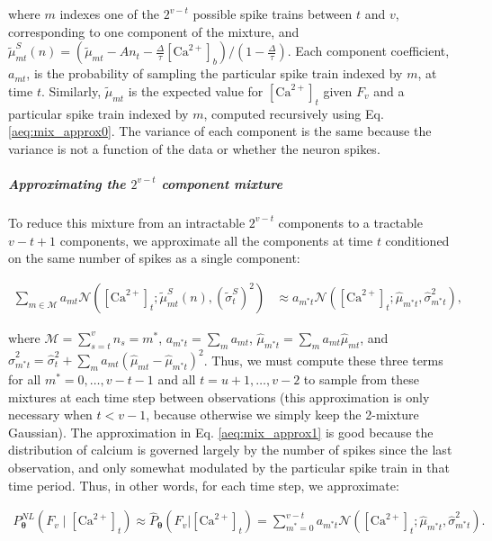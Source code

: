 \documentclass[10pt]{article}
\providecommand{\ve}[1]{\boldsymbol{#1}}
\providecommand{\ve}[1]{\boldsymbol{#1}}
\newcommand{\thetn}{\ve{\theta}}
\newcommand{\p}{P_{\thetn}}
\newcommand{\phat}{\widehat{P}_{\thetn}(F_v | \Ca_t)}
\newcommand{\m}{m^{\ast}}
\newcommand{\Ca}{[\text{Ca}^{2+}]}
\begin{document}
\noindent  where $m$ indexes one of the $2^{v-t}$ possible spike trains between $t$ and $v$, corresponding to one component of the mixture, and $\widetilde{\mu}^{S}_{mt}(n)=(\widetilde{\mu}_{mt} - A n_t - \frac{\Delta}{\tau} \Ca_b)/(1-\frac{\Delta}{\tau})$.  Each component coefficient, $a_{mt}$, is the probability of sampling the particular spike train indexed by $m$, at time $t$.  Similarly, $\widetilde{\mu}_{mt}$ is the expected value for $\Ca_t$ given $F_v$ and a particular spike train indexed by $m$, computed recursively using Eq. \ref{aeq:mix_approx0}.  The variance of each component is the same because the variance is not a function of the data or whether the neuron spikes.

\subparagraph{Approximating the $2^{v-t}$ component mixture}

To reduce this mixture from an intractable $2^{v-t}$ components to a tractable $v-t+1$ components, we approximate all the components at time $t$ conditioned on the same number of spikes as a single component: %

\begin{align} \label{aeq:mix_approx1}
\sum_{m \in \mathcal{M}} a_{mt} \mathcal{N}(\Ca_t; \widetilde{\mu}^S_{mt}(n), (\widetilde{\sigma}^S_t)^2) &\approx a_{\m t} \mathcal{N}(\Ca_t; \widehat{\mu}_{\m t}, \widehat{\sigma}_{\m t}^2),
\end{align}

\noindent where $\mathcal{M}=\sum_{s=t}^v n_s=m^\ast$, $a_{\m t}=\sum_m a_{mt}$, $\widehat{\mu}_{\m t}=\sum_m a_{mt} \widehat{\mu}_{mt}$, and $\widehat{\sigma}_{\m t}^2 = \widehat{\sigma}_t^2 + \sum_m a_{mt} (\widehat{\mu}_{mt}-\widehat{\mu}_{\m t})^2$.  Thus, we must compute these three terms for all $\m=0,\ldots,v-t-1$ and all $t=u+1,\ldots, v-2$ to sample from these mixtures at each time step between observations (this approximation is only necessary when $t<v-1$, because otherwise we simply keep the 2-mixture Gaussian). The approximation in Eq. \ref{aeq:mix_approx1} is good because the distribution of calcium is governed largely by the number of spikes since the last observation, and only somewhat modulated by the particular spike train in that time period.   Thus, in other words, for each time step, we approximate:

\begin{align} \label{eq:pF_approx}
\p^{NL}(F_v \mid \Ca_t) \approx \phat = \sum_{\m =0}^{v-t} a_{\m t} \mathcal{N}(\Ca_t; \widehat{\mu}_{\m t}, \widehat{\sigma}_{\m t}^2).
\end{align}
\end{document}

